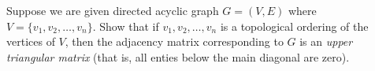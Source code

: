 Suppose we are given directed acyclic graph $G=(V,E)$ where
$V=\{v_{1},v_{2},\ldots,v_{n}\}$.  Show that if $v_{1},v_{2},\ldots,v_{n}$ is
a topological ordering of the vertices of $V$, then the adjacency matrix 
corresponding to $G$ is an {\em upper triangular matrix} (that is, all enties 
below the main diagonal are zero).
